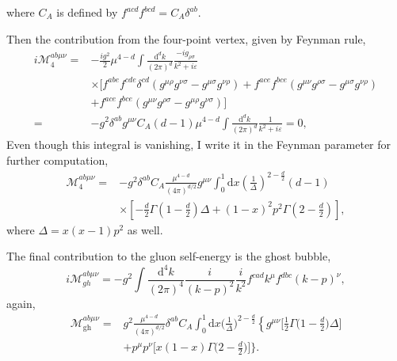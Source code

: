 \documentclass[a4paper,12pt]{article}
\renewcommand{\d}{\mathrm{d}}
\begin{document}
where $C_A$ is defined by $f^{acd}f^{bcd}=C_A\delta^{ab}$.\par
Then the contribution from the four-point vertex, given by Feynman rule,
\begin{equation}
    \begin{split}
        i\mathcal{M}_{4}^{ab\mu\nu}=
        &-\frac{ig^{2}}{2}\mu^{4-d}\int\frac{\d^{d}k}{\left(2\pi\right)^{d}}\frac{-ig_{\rho\sigma}}{k^{2}+i\varepsilon}\\
        &\times[f^{abe}f^{cde}\delta^{cd}(g^{\mu\rho}g^{\nu\sigma}-g^{\mu\sigma}g^{\nu\rho})+f^{ace}f^{bce}(g^{\mu\nu}g^{\rho\sigma}-g^{\mu\sigma}g^{\nu\rho})\\
        &+f^{ace}f^{bce}(g^{\mu\nu}g^{\rho\sigma}-g^{\mu\rho}g^{\nu\sigma})\Big]\\
        =&-g^{2}\delta^{ab}g^{\mu\nu}C_{A}(d-1)\mu^{4-d}\int\frac{\d^{d}k}{\left(2\pi\right)^{d}}\frac{1}{k^{2}+i\varepsilon}=0,
    \end{split}
\end{equation}
Even though this integral is vanishing, I write it in the Feynman parameter for further computation,
\begin{equation}
    \begin{split}
        \mathcal{M}_4^{ab\mu\nu}=&-g^{2}\delta^{ab}C_{A}\frac{\mu^{4-d}}{\left(4\pi\right)^{d/2}}g^{\mu\nu}\int_{0}^{1}\d x\left(\frac{1}{\Delta}\right)^{2-\frac{d}{2}}(d-1)\\
        &\times\left[-\frac{d}{2}\Gamma\left(1-\frac{d}{2}\right)\Delta+\left(1-x\right)^{2}p^{2}\Gamma\left(2-\frac{d}{2}\right)\right],
    \end{split}
\end{equation}
where $\Delta=x(x-1)p^2$ as well.\par
The final contribution to the gluon self-energy is the ghost bubble,
\begin{equation}
    i \mathcal{M}_{gh}^{ab \mu \nu}=-g^2\int\frac{\d^4k}{(2\pi)^4}\frac{i}{(k-p)^2}\frac{i}{k^2}f^{cad}k^\mu f^{dbc}(k-p)^\nu,
\end{equation}
again,
\begin{equation}
    \begin{split}
        \mathcal{M}_{\mathrm{gh}}^{ab\mu\nu}=&g^{2}\frac{\mu^{4-d}}{\left(4\pi\right)^{d/2}}\delta^{ab}C_{A}\int_{0}^{1}\d x\biggl(\frac{1}{\Delta}\biggr)^{2-\frac{d}{2}}\left\{g^{\mu\nu}\biggl[\frac{1}{2}\Gamma\biggl(1-\frac{d}{2}\biggr)\Delta\biggr]\right.\\
        &+p^{\mu}p^{\nu}\bigg[x(1-x)\Gamma\bigg(2-\frac{d}{2}\bigg)\bigg]\bigg\}.
    \end{split}
\end{equation}
\end{document}
